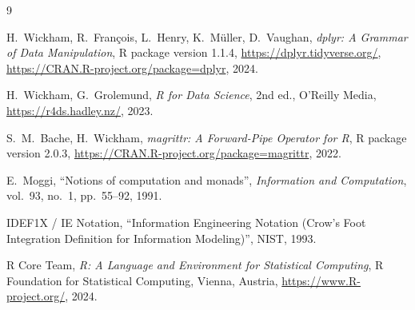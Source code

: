 \documentclass[12pt,a4paper]{ltjsarticle}
\begin{document}
\begin{thebibliography}{9}

  H.~Wickham, R.~François, L.~Henry, K.~Müller, D.~Vaughan,
  \textit{dplyr: A Grammar of Data Manipulation},
  R package version 1.1.4,
  \url{https://dplyr.tidyverse.org/},
  \url{https://CRAN.R-project.org/package=dplyr},
  2024.

  H.~Wickham, G.~Grolemund,
  \textit{R for Data Science},
  2nd ed., O'Reilly Media,
  \url{https://r4ds.hadley.nz/},
  2023.

  S.~M.~Bache, H.~Wickham,
  \textit{magrittr: A Forward-Pipe Operator for R},
  R package version 2.0.3,
  \url{https://CRAN.R-project.org/package=magrittr},
  2022.

  E.~Moggi,
  ``Notions of computation and monads'',
  \textit{Information and Computation},
  vol.~93, no.~1, pp.~55--92, 1991.

  IDEF1X / IE Notation,
  ``Information Engineering Notation (Crow's Foot Integration Definition for Information Modeling)'',
  NIST, 1993.

  R Core Team,
  \textit{R: A Language and Environment for Statistical Computing},
  R Foundation for Statistical Computing, Vienna, Austria,
  \url{https://www.R-project.org/},
  2024.

\end{thebibliography}
\end{document}
